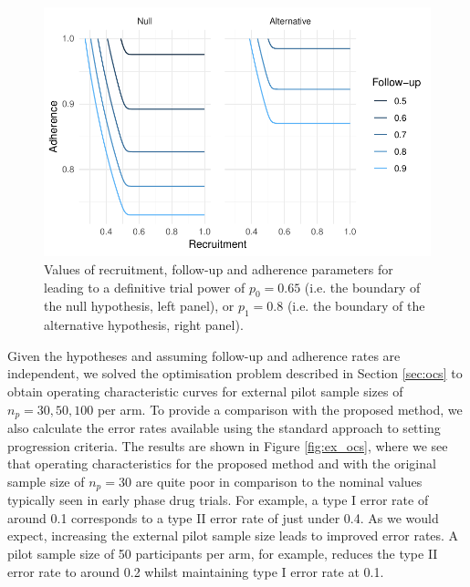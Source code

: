 \documentclass[AMA,STIX1COL]{WileyNJD-v2}
\begin{document}

\begin{figure}
\centering
\includegraphics[scale=0.8]{./Figures/hyps.pdf}
\caption{Values of recruitment, follow-up and adherence parameters for leading to a definitive trial power of $p_0 = 0.65$ (i.e. the boundary of the null hypothesis, left panel), or $p_1 = 0.8$ (i.e. the boundary of the alternative hypothesis, right panel).}
\label{fig:hyps}
\end{figure}

Given the hypotheses and assuming follow-up and adherence rates are independent, we solved the optimisation problem described in Section \ref{sec:ocs} to obtain operating characteristic curves for external pilot sample sizes of $n_p = 30, 50, 100$ per arm. To provide a comparison with the proposed method, we also calculate the error rates available using the standard approach to setting progression criteria. The results are shown in Figure \ref{fig:ex_ocs}, where we see that operating characteristics for the proposed method and with the original sample size of $n_p = 30$ are quite poor in comparison to the nominal values typically seen in early phase drug trials. For example, a type I error rate of around 0.1 corresponds to a type II error rate of just under 0.4. As we would expect, increasing the external pilot sample size leads to improved error rates. A pilot sample size of 50 participants per arm, for example, reduces the type II error rate to around 0.2 whilst maintaining type I error rate at 0.1.
\end{document}
